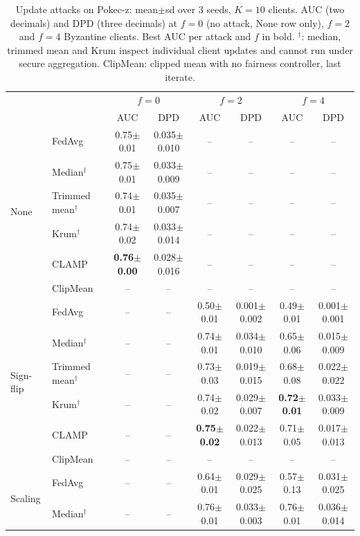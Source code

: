\begin{table}[tbp]
\centering
\scriptsize
\setlength{\tabcolsep}{2pt}
\caption{Update attacks on Pokec-z: mean$\pm$sd over 3 seeds, $K=10$ clients. AUC (two decimals) and DPD (three decimals) at $f=0$ (no attack, None row only), $f=2$ and $f=4$ Byzantine clients. Best AUC per attack and $f$ in bold. $^\dagger$: median, trimmed mean and Krum inspect individual client updates and cannot run under secure aggregation. ClipMean: clipped mean with no fairness controller, last iterate.}
\label{tab:e3_pokec}
\begin{tabular}{llcccccc}
\toprule
 & & \multicolumn{2}{c}{$f=0$} & \multicolumn{2}{c}{$f=2$} & \multicolumn{2}{c}{$f=4$} \\
 & & AUC & DPD & AUC & DPD & AUC & DPD \\
\midrule
\multirow{6}{*}{None} & FedAvg & 0.75$\pm$0.01 & 0.035$\pm$0.010 & -- & -- & -- & -- \\
 & Median$^\dagger$ & 0.75$\pm$0.01 & 0.033$\pm$0.009 & -- & -- & -- & -- \\
 & Trimmed mean$^\dagger$ & 0.74$\pm$0.01 & 0.035$\pm$0.007 & -- & -- & -- & -- \\
 & Krum$^\dagger$ & 0.74$\pm$0.02 & 0.033$\pm$0.014 & -- & -- & -- & -- \\
 & CLAMP & \textbf{0.76$\pm$0.00} & 0.028$\pm$0.016 & -- & -- & -- & -- \\
 & ClipMean & -- & -- & -- & -- & -- & -- \\
\midrule
\multirow{6}{*}{Sign-flip} & FedAvg & -- & -- & 0.50$\pm$0.01 & 0.001$\pm$0.002 & 0.49$\pm$0.01 & 0.001$\pm$0.001 \\
 & Median$^\dagger$ & -- & -- & 0.74$\pm$0.01 & 0.034$\pm$0.010 & 0.65$\pm$0.06 & 0.015$\pm$0.009 \\
 & Trimmed mean$^\dagger$ & -- & -- & 0.73$\pm$0.03 & 0.019$\pm$0.015 & 0.68$\pm$0.08 & 0.022$\pm$0.022 \\
 & Krum$^\dagger$ & -- & -- & 0.74$\pm$0.02 & 0.029$\pm$0.007 & \textbf{0.72$\pm$0.01} & 0.033$\pm$0.009 \\
 & CLAMP & -- & -- & \textbf{0.75$\pm$0.02} & 0.022$\pm$0.013 & 0.71$\pm$0.05 & 0.017$\pm$0.013 \\
 & ClipMean & -- & -- & -- & -- & -- & -- \\
\midrule
\multirow{6}{*}{Scaling} & FedAvg & -- & -- & 0.64$\pm$0.01 & 0.029$\pm$0.025 & 0.57$\pm$0.13 & 0.031$\pm$0.025 \\
 & Median$^\dagger$ & -- & -- & 0.76$\pm$0.01 & 0.033$\pm$0.003 & 0.76$\pm$0.01 & 0.036$\pm$0.014 \\

\end{tabular}
\end{table}
